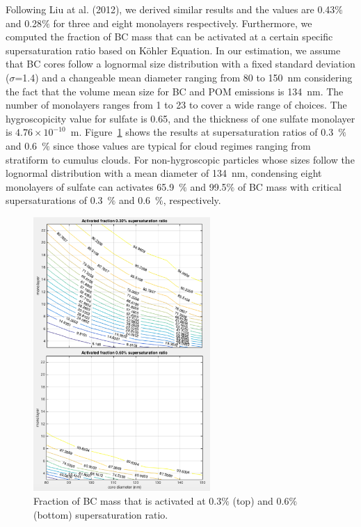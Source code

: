 \documentclass[12pt, fullpage]{uiucthesis2009}
\begin{document}
		Following Liu at al. (2012), we derived similar results and the values are 0.43$\%$ and 0.28$\%$ for three and eight monolayers respectively. Furthermore, we computed the fraction of BC mass that can be activated at a certain specific supersaturation ratio based on K{\" o}hler Equation. In our estimation, we assume that BC cores follow a lognormal size distribution with a fixed standard deviation ($\sigma$=1.4) and a changeable mean diameter ranging from 80 to 150~nm considering the fact that the volume mean size for BC and POM emissions is 134~nm. The number of monolayers ranges from 1 to 23 to cover a wide range of choices. The hygroscopicity value for sulfate is 0.65, and the thickness of one sulfate monolayer is $4.76 \times 10^{-10}$~m. Figure~\ref{fig_P10} shows the results at supersaturation ratios of 0.3~$\%$ and 0.6~$\%$ since those values are typical for cloud regimes ranging from stratiform to cumulus clouds. For non-hygroscopic particles whose sizes follow the lognormal distribution with a mean diameter of 134~nm, condensing eight monolayers of sulfate can activates 65.9~$\%$ and 99.5$\%$ of BC mass with critical supersaturations of 0.3~$\%$ and 0.6~$\%$, respectively.  
		
		\begin{figure}[h] 
			\begin{center}
				\includegraphics[width = 0.6\textwidth]{Figure10}
				\caption[Fraction of BC mass that is activated at 0.3$\%$ (top) and 0.6$\%$ (bottom) supersaturation ratio]{\label{fig_P10} Fraction of BC mass that is activated at 0.3$\%$ (top) and 0.6$\%$ (bottom) supersaturation ratio.}
			\end{center}
		\end{figure}
\end{document}
